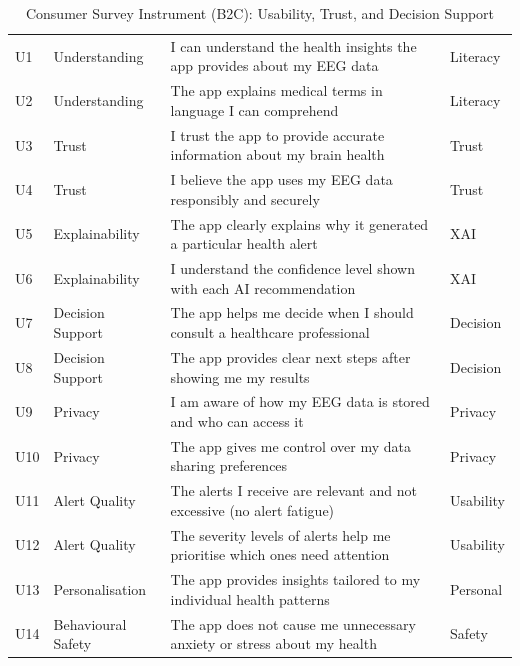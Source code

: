 \begin{table}[p]
\tablestripes
\tablefontsize
\caption[Consumer Survey Instrument (B2C): Usability, Trust, and]{Consumer Survey Instrument (B2C): Usability, Trust, and Decision Support}
\begin{tabularx}{\textwidth}{@{} >{\raggedright\arraybackslash}p{0.5cm} >{\raggedright\arraybackslash}p{2.2cm} L >{\raggedright\arraybackslash}p{1.5cm} @{}}
\toprule
\thead{\#} &  &  &  \\
\midrule
U1 & Understanding & I can understand the health insights the app provides about my EEG data & Literacy \\
\addlinespace
U2 & Understanding & The app explains medical terms in language I can comprehend & Literacy \\
\addlinespace
U3 & Trust & I trust the app to provide accurate information about my brain health & Trust \\
\addlinespace
U4 & Trust & I believe the app uses my EEG data responsibly and securely & Trust \\
\addlinespace
U5 & Explainability & The app clearly explains why it generated a particular health alert & XAI \\
\addlinespace
U6 & Explainability & I understand the confidence level shown with each AI recommendation & XAI \\
\addlinespace
U7 & Decision Support & The app helps me decide when I should consult a healthcare professional & Decision \\
\addlinespace
U8 & Decision Support & The app provides clear next steps after showing me my results & Decision \\
\addlinespace
U9 & Privacy & I am aware of how my EEG data is stored and who can access it & Privacy \\
\addlinespace
U10 & Privacy & The app gives me control over my data sharing preferences & Privacy \\
\addlinespace
U11 & Alert Quality & The alerts I receive are relevant and not excessive (no alert fatigue) & Usability \\
\addlinespace
U12 & Alert Quality & The severity levels of alerts help me prioritise which ones need attention & Usability \\
\addlinespace
U13 & Personalisation & The app provides insights tailored to my individual health patterns & Personal \\
\addlinespace
U14 & Behavioural Safety & The app does not cause me unnecessary anxiety or stress about my health & Safety \\

\end{tabularx}
\end{table}
